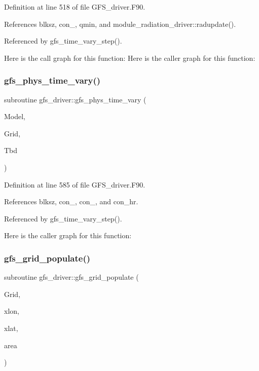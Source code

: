 Definition at line 518 of file G\+F\+S\+\_\+driver.\+F90.



References blksz, con\+\_, qmin, and module\+\_\+radiation\+\_\+driver\+::radupdate().



Referenced by gfs\+\_\+time\+\_\+vary\+\_\+step().

Here is the call graph for this function\+:
Here is the caller graph for this function\+:
\mbox{\label{namespacegfs__driver_a9085d55c53755e5dd9cfae5665dc8a60}} 
\subsubsection{gfs\+\_\+phys\+\_\+time\+\_\+vary()}
{\footnotesize\ttfamily subroutine gfs\+\_\+driver\+::gfs\+\_\+phys\+\_\+time\+\_\+vary (\begin{DoxyParamCaption}\item[{type(gfs\+\_\+control\+\_\+type), intent(inout)}]{Model,  }\item[{type(gfs\+\_\+grid\+\_\+type), dimension(\+:), intent(inout)}]{Grid,  }\item[{type(gfs\+\_\+tbd\+\_\+type), dimension(\+:), intent(inout)}]{Tbd }\end{DoxyParamCaption})}



Definition at line 585 of file G\+F\+S\+\_\+driver.\+F90.



References blksz, con\+\_, con\+\_, and con\+\_\+hr.



Referenced by gfs\+\_\+time\+\_\+vary\+\_\+step().

Here is the caller graph for this function\+:
\mbox{\label{namespacegfs__driver_a59f5e1e0612794f6801490d8d642b89b}} 
\subsubsection{gfs\+\_\+grid\+\_\+populate()}
{\footnotesize\ttfamily subroutine gfs\+\_\+driver\+::gfs\+\_\+grid\+\_\+populate (\begin{DoxyParamCaption}\item[{type(gfs\+\_\+grid\+\_\+type), dimension(\+:)}]{Grid,  }\item[{real(kind=kind\+\_\+phys), dimension(\+:,\+:), intent(in)}]{xlon,  }\item[{real(kind=kind\+\_\+phys), dimension(\+:,\+:), intent(in)}]{xlat,  }\item[{real(kind=kind\+\_\+phys), dimension(\+:,\+:), intent(in)}]{area }\end{DoxyParamCaption})}



